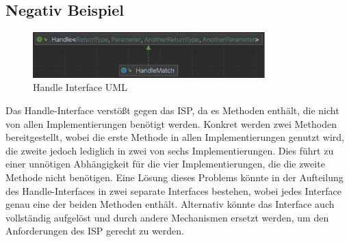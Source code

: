 \subsection{Negativ Beispiel}
\begin{figure}[ht]
    \centering
    \includegraphics[width=0.8\textwidth]{Bilder/HandleInterfaceUML.png}
    \caption{Handle Interface UML}
    \label{fig:handleinterface-uml}
\end{figure}
Das Handle-Interface verstößt gegen das \ac{ISP}, da es Methoden enthält, die nicht von allen Implementierungen benötigt werden. Konkret werden zwei Methoden bereitgestellt, wobei die erste Methode in allen Implementierungen genutzt wird, die zweite jedoch lediglich in zwei von sechs Implementierungen. Dies führt zu einer unnötigen Abhängigkeit für die vier Implementierungen, die die zweite Methode nicht benötigen. Eine Lösung dieses Problems könnte in der Aufteilung des Handle-Interfaces in zwei separate Interfaces bestehen, wobei jedes Interface genau eine der beiden Methoden enthält. Alternativ könnte das Interface auch vollständig aufgelöst und durch andere Mechanismen ersetzt werden, um den Anforderungen des \ac{ISP} gerecht zu werden.
